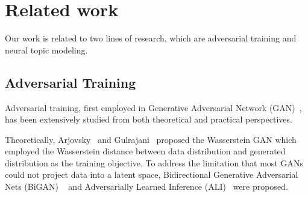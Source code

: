 \documentclass[11pt,a4paper]{article}
\begin{document}
\section{Related work}
Our work is related to two lines of research, which are adversarial training and neural topic modeling.

\begin{comment}
\subsection{Word Representation Learning}
Distributed semantic models have recently been applied successfully in many NLP tasks~\cite{liu2018content,lei2018saan}. A notable example is \emph{word2vec} which relies on the skip-gram with negative sampling training method~\cite{mikolov2013efficient,mikolov2013distributed}. However, \emph{word2vec} only employs local context information. To address this limitation, Pennington~\shortcite{pennington2014glove} proposed a global log-bilinear regression model, called \emph{GloVe}, which combines advantages of the global matrix factorization and local context window methods. To deal with out-of-vocabulary words, \emph{FastText}~\cite{joulin2017bag} was proposed which generates word embeddings as the sum of their character-level -grams representations. More recently, \emph{Probabilistic FastText}~\cite{athiwaratkun2018probabilistic} was proposed which is able to capture multiple word senses, sub-word structure, and uncertainty information jointly.
\end{comment}

\subsection{Adversarial Training}

Adversarial training, first employed in Generative Adversarial Network (GAN)~\cite{goodfellow2014generative}, has been extensively studied from both theoretical and practical perspectives.

Theoretically, Arjovsky~ and Gulrajani~ proposed the Wasserstein GAN which employed the Wasserstein distance between data distribution and generated distribution as the training objective. To address the limitation that most GANs~\cite{goodfellow2014generative,radford2015unsupervised} could not project data into a latent space, Bidirectional Generative Adversarial Nets (BiGAN) ~\cite{donahue2016adversarial} and Adversarially Learned Inference (ALI)~\cite{dumoulin2016adversarially} were proposed.
\end{document}
